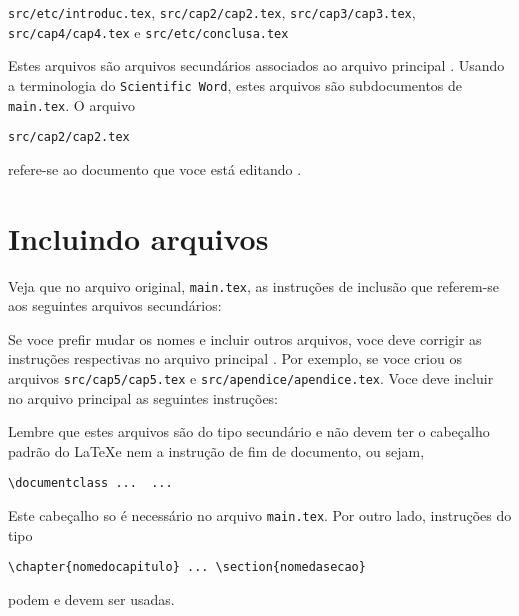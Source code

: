 \noindent\texttt{src/etc/introduc.tex}, \texttt{src/cap2/cap2.tex},
\texttt{src/cap3/cap3.tex}, \texttt{src/cap4/cap4.tex} e \texttt{src/etc/conclusa.tex}

Estes arquivos são arquivos secundários associados ao arquivo
principal \cite{AbTaRu:54}. Usando a terminologia do \texttt{Scientific Word},
estes arquivos são subdocumentos de \texttt{main.tex}. O arquivo
\begin{verbatim}
src/cap2/cap2.tex
\end{verbatim}
refere-se ao documento que voce está editando
\cite{IEEEexample:masterstype}.

\section{Incluindo arquivos}

Veja que no arquivo original, \texttt{main.tex}, as instruções de
inclusão que referem-se aos seguintes arquivos secundários:

\noindent\verb||

\noindent\verb||

\noindent\verb||

Se voce prefir mudar os nomes e incluir outros arquivos, voce deve
corrigir as instruções respectivas no arquivo principal
\cite{IEEEexample:phdurl}. Por exemplo, se voce criou os arquivos
\texttt{src/cap5/cap5.tex} e \texttt{src/apendice/apendice.tex}. Voce deve incluir no arquivo principal as seguintes instruções:

\noindent\verb||

\noindent\verb||

Lembre que estes arquivos são do tipo secundário e não devem ter o cabeçalho padrão do \LaTeX  e nem a instrução de fim de documento, ou sejam,
\begin{verbatim}
\documentclass ...  ... 
\end{verbatim}

Este cabeçalho so é necessário no arquivo \texttt{main.tex}. Por outro
lado, instruções do tipo
\begin{verbatim}
\chapter{nomedocapitulo} ... \section{nomedasecao}
\end{verbatim}
podem e devem ser usadas.

